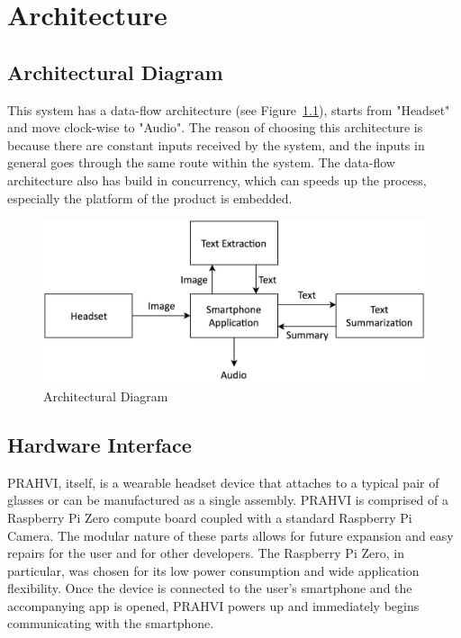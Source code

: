 \chapter{Architecture}
\section{Architectural Diagram}
This system has a data-flow architecture (see Figure~\ref{architectualDiagram}), starts from "Headset" and move clock-wise to "Audio". The reason of choosing this architecture is because there are constant inputs received by the system, and the inputs in general goes through the same route within the system. The data-flow architecture also has build in concurrency, which can speeds up the process, especially the platform of the product is embedded.
\begin{figure}
	\centering
    \includegraphics[scale = 0.2]{ArchitectureDiagram.png}
    
    \caption{Architectural Diagram}
	\label{architectualDiagram}
\end{figure}

\section{Hardware Interface}
PRAHVI, itself, is a wearable headset device that attaches to a typical pair of glasses or can be manufactured as a single assembly. PRAHVI is comprised of a Raspberry Pi Zero compute board coupled with a standard Raspberry Pi Camera. The modular nature of these parts allows for future expansion and easy repairs for the user and for other developers. The Raspberry Pi Zero, in particular, was chosen for its low power consumption and wide application flexibility. Once the device is connected to the user's smartphone and the accompanying app is opened, PRAHVI powers up and immediately begins communicating with the smartphone.

